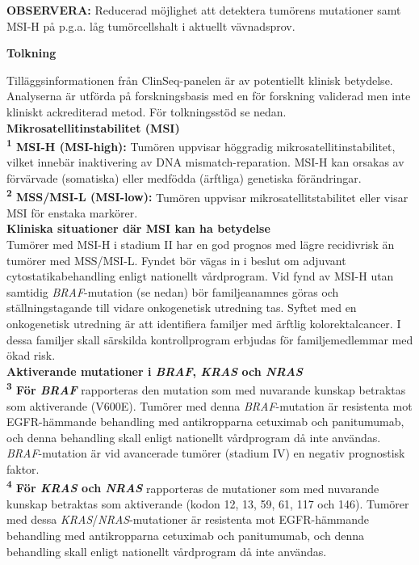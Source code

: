 \documentclass[10pt]{article}
\begin{document}
\vspace{0.3cm}

  \textbf{OBSERVERA:} {\small Reducerad möjlighet att detektera tumörens mutationer samt MSI-H på p.g.a. låg tumörcellshalt i aktuellt vävnadsprov.}

  \vspace{0.3cm}

\textbf{Tolkning} \par
{\small
Tilläggsinformationen från ClinSeq-panelen är av potentiellt klinisk betydelse. Analyserna är utförda på forskningsbasis med en för forskning validerad men inte kliniskt ackrediterad metod. För tolkningsstöd se nedan. \\

\textbf{Mikrosatellitinstabilitet (MSI)}\\
\textbf{\textsuperscript{1} MSI-H (MSI-high):} Tumören uppvisar höggradig mikrosatellitinstabilitet, vilket innebär inaktivering av DNA mismatch-reparation. MSI-H kan orsakas av förvärvade (somatiska) eller medfödda (ärftliga) genetiska förändringar. \\
\textbf{\textsuperscript{2} MSS/MSI-L (MSI-low):} Tumören uppvisar mikrosatellitstabilitet eller visar MSI för enstaka markörer. \\

\textbf{Kliniska situationer där MSI kan ha betydelse}\\
Tumörer med MSI-H i stadium II har en god prognos med lägre recidivrisk än tumörer med MSS/MSI-L. Fyndet bör vägas in i beslut om adjuvant cytostatikabehandling enligt nationellt vårdprogram. Vid fynd av MSI-H utan samtidig \textit{BRAF}-mutation (se nedan) bör familjeanamnes göras och ställningstagande till vidare onkogenetisk utredning tas. Syftet med en onkogenetisk utredning är att identifiera familjer med ärftlig kolorektalcancer. I dessa familjer skall särskilda kontrollprogram erbjudas för familjemedlemmar med ökad risk. \\

\textbf{Aktiverande mutationer i \textit{BRAF}, \textit{KRAS} och \textit{NRAS}}\\
\textbf{\textsuperscript{3} För \textit{BRAF}} rapporteras den mutation som med nuvarande kunskap betraktas som aktiverande (V600E). Tumörer med denna \textit{BRAF}-mutation är resistenta mot EGFR-hämmande behandling med antikropparna cetuximab och panitumumab, och denna behandling skall enligt nationellt vårdprogram då inte användas. \textit{BRAF}-mutation är vid avancerade tumörer (stadium IV) en negativ prognostisk faktor. \\
\textbf{\textsuperscript{4} För \textit{KRAS} och \textit{NRAS}} rapporteras de mutationer som med nuvarande kunskap betraktas som aktiverande (kodon 12, 13, 59, 61, 117 och 146). Tumörer med dessa \textit{KRAS}/\textit{NRAS}-mutationer är resistenta mot EGFR-hämmande behandling med antikropparna cetuximab och panitumumab, och denna behandling skall enligt nationellt vårdprogram då inte användas. \\
}
\par

\end{document}
